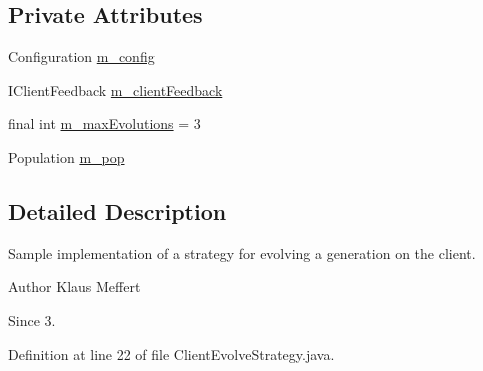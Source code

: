 \subsection*{Private Attributes}
\begin{DoxyCompactItemize}
\item 
Configuration \hyperlink{classexamples_1_1grid_1_1fitness_distributed_1_1_client_evolve_strategy_aacec10581f524f5dce17f416de96affa}{m\-\_\-config}
\item 
I\-Client\-Feedback \hyperlink{classexamples_1_1grid_1_1fitness_distributed_1_1_client_evolve_strategy_a61f755a872db4d7a4e41fdfbc6cd75df}{m\-\_\-client\-Feedback}
\item 
final int \hyperlink{classexamples_1_1grid_1_1fitness_distributed_1_1_client_evolve_strategy_ab2a181827fc5cba31c595505808cb815}{m\-\_\-max\-Evolutions} = 3
\item 
Population \hyperlink{classexamples_1_1grid_1_1fitness_distributed_1_1_client_evolve_strategy_a3aa392e608c9e310d0d825880d69d6c9}{m\-\_\-pop}
\end{DoxyCompactItemize}


\subsection{Detailed Description}
Sample implementation of a strategy for evolving a generation on the client.

\begin{DoxyAuthor}{Author}
Klaus Meffert 
\end{DoxyAuthor}
\begin{DoxySince}{Since}
3. 
\end{DoxySince}


Definition at line 22 of file Client\-Evolve\-Strategy.\-java.



